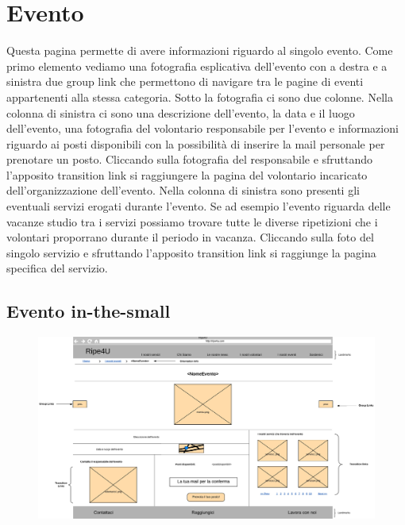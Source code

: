     \section{Evento}
    Questa pagina permette di avere informazioni riguardo al singolo evento.
    Come primo elemento vediamo una fotografia esplicativa dell'evento con a
    destra e a sinistra due group link che permettono di navigare tra le pagine
    di eventi appartenenti alla stessa categoria. Sotto la fotografia ci sono
    due colonne. Nella colonna di sinistra ci sono una descrizione dell'evento,
    la data e il luogo dell'evento, una fotografia del volontario responsabile
    per l'evento e informazioni riguardo ai posti disponibili con la possibilità
    di inserire la mail personale per prenotare un posto. Cliccando sulla
    fotografia del responsabile e sfruttando l'apposito transition link si
    raggiungere la pagina del volontario incaricato dell'organizzazione
    dell'evento. Nella colonna di sinistra sono presenti gli eventuali servizi
    erogati durante l'evento. Se ad esempio l'evento riguarda delle vacanze
    studio tra i servizi possiamo trovare tutte le diverse ripetizioni che i
    volontari proporrano durante il periodo in vacanza. Cliccando sulla foto del
    singolo servizio e sfruttando l'apposito transition link si raggiunge la
    pagina specifica del servizio.

        \subsection{Evento in-the-small}
        \begin{figure}[H]
            \centering
            \includegraphics[scale=0.37]{resources/images/evento-in-the-small.jpg}
        \end{figure}

